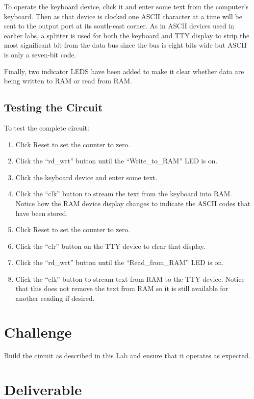 To operate the keyboard device, click it and enter some text from the computer's keyboard. Then as that device is clocked one ASCII character at a time will be sent to the output port at its south-east corner. As in ASCII devices used in earlier labs, a splitter is used for both the keyboard and TTY display to strip the most significant bit from the data bus since the bus is eight bits wide but ASCII is only a seven-bit code.

Finally, two indicator LEDS have been added to make it clear whether data are being written to RAM or read from RAM.

\subsection{Testing the Circuit}

To test the complete circuit:

\begin{enumerate}
	\item Click Reset to set the counter to zero.
	\item Click the ``rd\_wrt'' button until the ``Write\_to\_RAM'' LED is on.
	\item Click the keyboard device and enter some text.
	\item Click the ``clk'' button to stream the text from the keyboard into RAM. Notice how the RAM device display changes to indicate the ASCII codes that have been stored.
	\item Click Reset to set the counter to zero.
	\item Click the ``clr'' button on the TTY device to clear that display.
	\item Click the ``rd\_wrt'' button until the ``Read\_from\_RAM'' LED is on.
	\item Click the ``clk'' button to stream text from RAM to the TTY device. Notice that this does not remove the text from RAM so it is still available for another reading if desired.
\end{enumerate}

\section{Challenge}

Build the circuit as described in this Lab and ensure that it operates as expected.

\section{Deliverable}

